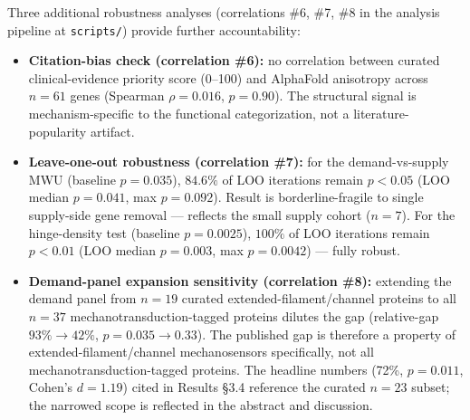 Three additional robustness analyses (correlations \#6, \#7, \#8 in the analysis pipeline at \texttt{scripts/}) provide further accountability:

\begin{itemize}
\item \textbf{Citation-bias check (correlation \#6):} no correlation between curated clinical-evidence priority score (0--100) and AlphaFold anisotropy across $n=61$ genes (Spearman $\rho = 0.016$, $p = 0.90$). The structural signal is mechanism-specific to the functional categorization, not a literature-popularity artifact.
\item \textbf{Leave-one-out robustness (correlation \#7):} for the demand-vs-supply MWU (baseline $p = 0.035$), $84.6\%$ of LOO iterations remain $p < 0.05$ (LOO median $p = 0.041$, max $p = 0.092$). Result is borderline-fragile to single supply-side gene removal --- reflects the small supply cohort ($n = 7$). For the hinge-density test (baseline $p = 0.0025$), $100\%$ of LOO iterations remain $p < 0.01$ (LOO median $p = 0.003$, max $p = 0.0042$) --- fully robust.
\item \textbf{Demand-panel expansion sensitivity (correlation \#8):} extending the demand panel from $n=19$ curated extended-filament/channel proteins to all $n=37$ mechanotransduction-tagged proteins dilutes the gap (relative-gap $93\% \rightarrow 42\%$, $p = 0.035 \rightarrow 0.33$). The published gap is therefore a property of extended-filament/channel mechanosensors specifically, not all mechanotransduction-tagged proteins. The headline numbers (72\%, $p = 0.011$, Cohen's $d = 1.19$) cited in Results §3.4 reference the curated $n = 23$ subset; the narrowed scope is reflected in the abstract and discussion.
\end{itemize}
